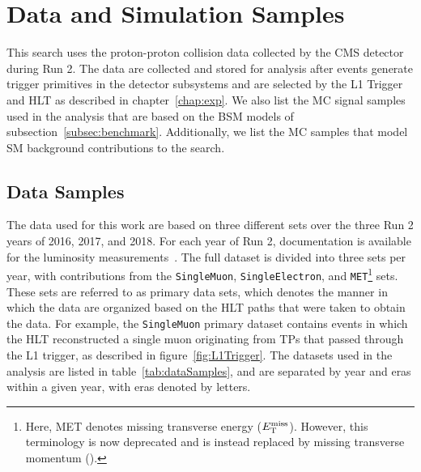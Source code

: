 
\section{Data and Simulation Samples}
\label{sec:samples}

This search uses the proton-proton collision data collected by the CMS detector during Run 2.
The data are collected and stored for analysis after events generate trigger primitives in the detector subsystems and are selected by the L1 Trigger and HLT as described in chapter~\ref{chap:exp}.
We also list the MC signal samples used in the analysis that are based on the BSM models of subsection~\ref{subsec:benchmark}.
Additionally, we list the MC samples that model SM background contributions to the search.

\subsection{Data Samples}

The data used for this work are based on three different sets over the three Run 2 years of 2016, 2017, and 2018.
For each year of Run 2, documentation is available for the luminosity measurements~\cite{CMS-PAS-LUM-17-001,CMS-PAS-LUM-17-004,CMS-PAS-LUM-18-002}.
The full dataset is divided into three sets per year, with contributions from the \texttt{SingleMuon}, \texttt{SingleElectron}, and \texttt{MET}\footnote{Here, MET denotes missing transverse energy ($E_\mathrm{T}^\mathrm{miss}$). However, this terminology is now deprecated and is instead replaced by missing transverse momentum (\ptmiss).} sets.
These sets are referred to as primary data sets, which denotes the manner in which the data are organized based on the HLT paths that were taken to obtain the data. %
For example, the \texttt{SingleMuon} primary dataset contains events in which the HLT reconstructed a single muon originating from TPs that passed through the L1 trigger, as described in figure~\ref{fig:L1Trigger}.
The datasets used in the analysis are listed in table~\ref{tab:dataSamples}, and are separated by year and eras within a given year, with eras denoted by letters.

